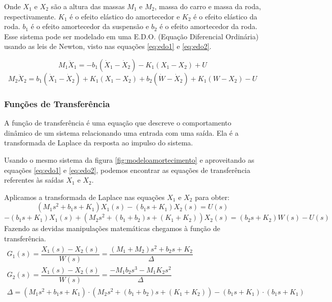 Onde $X_1$ e $X_2$ são a altura das massas $M_1$ e $M_2$, massa do carro e massa da roda, respectivamente. $K_1$ é o efeito elástico do amortecedor e $K_2$ é o efeito elástico da roda. $b_1$ é o efeito amortecedor da suspensão e $b_2$ é o efeito amortecedor da roda.
Esse sistema pode ser modelado em uma E.D.O. (Equação Diferencial Ordinária) usando as leis de Newton, visto nas equações \eqref{eq:edo1} e \eqref{eq:edo2}.

\begin{equation} \label{eq:edo1}
M_1 \ddot{X}_1=-b_1(\dot{X}_1-\dot{X}_2) -K_1(X_1-X_2)+U
\end{equation}
\begin{equation} \label{eq:edo2}
M_2 \ddot{X}_2=b_1 (\dot{X}_1 -\dot{X}_2) +K_1(X_1-X_2) +b_2(\dot{W} -\dot{X}_2)+K_1(W-X_2) -U
\end{equation}

\subsubsection{Funções de Transferência}
A função de transferência é uma equação que descreve o comportamento dinâmico de um sistema relacionando uma entrada com uma saída. Ela é a transformada de Laplace da resposta ao impulso do sistema.

Usando o mesmo sistema da figura \ref{fig:modeloamortecimento} e aproveitando as equações \eqref{eq:edo1} e \eqref{eq:edo2}, podemos encontrar as equações de transferência referentes às saídas $X_1$ e $X_2$.

Aplicamos a transformada de Laplace nas equações $X_1$ e $X_2$ para obter:
\begin{equation} \label{eq:e2121}
(M_1s^2+b_1s+K_1) X_1(s) -(b_1s+K_1) X_2(s)=U(s)
\end{equation}
\begin{equation} \label{eq:e2122}
-(b_1s+ K_1) X_1(s) +(M_2s^2 + (b_1 + b_2)s +(K_1 + K_2))X_2(s)=(b_2s +K_2) W(s)-U(s)
\end{equation}
Fazendo as devidas manipulações matemáticas chegamos à função de transferência.
\begin{equation}\label{eq:e2123}
\begin{array}{c}
G_1(s)=\dfrac{X_1(s)-X_2(s)}{W(s)}= \dfrac{(M_1+M_2)s^2+b_2s+K_2} {\Delta}
\\
G_2(s)=\dfrac{X_1(s)-X_2(s)}{W(s)}= \dfrac{-M_1b_2s^3-M_1K_2s^2}{\Delta}
\\
\Delta=(M_1s^2+b_1s+K_1)\cdot (M_2s^2+ (b_1+b_2)s+(K_1+K_2))-(b_1s+K_1)\cdot (b_1s+K_1)
\end{array}
\end{equation}

